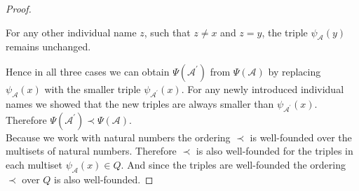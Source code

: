 \documentclass{book}
\theoremstyle{break}
\theoremstyle{definition}
\begin{document}
\begin{proof}
\begin{itemize}
For any other individual name $z$, such that $z\neq x$ and $z=y$, the triple $\psi_\mathcal{A}(y)$ remains unchanged.
\end{itemize}
Hence in all three cases we can obtain $\Psi(\mathcal{A}^\prime)$ from $\Psi(\mathcal{A})$ by replacing $\psi_\mathcal{A}(x)$ with the smaller triple $\psi_{\mathcal{A}^\prime}(x)$. For any newly introduced individual names we showed that the new triples are always smaller than $\psi_{\mathcal{A}^\prime}(x)$. Therefore $\Psi(\mathcal{A}^\prime)\prec\Psi(\mathcal{A})$.\\
Because we work with natural numbers the ordering $\prec$ is well-founded over the multisets of natural numbers. Therefore $\prec$ is also well-founded for the triples in each multiset $\psi_\mathcal{A}(x)\in Q$. And since the triples are well-founded the ordering $\prec$ over $Q$ is also well-founded.
\end{proof}
\end{document}
